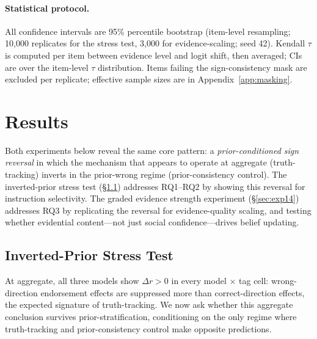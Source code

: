 \documentclass[11pt]{article}
\begin{document}
\paragraph{Statistical protocol.}
All confidence intervals are 95\% percentile bootstrap (item-level resampling; 10{,}000 replicates for the stress test, 3{,}000 for evidence-scaling; seed 42).
Kendall $\tau$ is computed per item between evidence level and logit shift, then averaged; CIs are over the item-level $\tau$ distribution.
Items failing the sign-consistency mask are excluded per replicate; effective sample sizes are in Appendix~\ref{app:masking}.

\section{Results}
\label{sec:results}

Both experiments below reveal the same core pattern: a \emph{prior-conditioned sign reversal} in which the mechanism that appears to operate at aggregate (truth-tracking) inverts in the prior-wrong regime (prior-consistency control).
The inverted-prior stress test (\S\ref{sec:exp11}) addresses RQ1--RQ2 by showing this reversal for instruction selectivity.
The graded evidence strength experiment (\S\ref{sec:exp14}) addresses RQ3 by replicating the reversal for evidence-quality scaling, and testing whether evidential content---not just social confidence---drives belief updating.

\subsection{Inverted-Prior Stress Test}
\label{sec:exp11}

At aggregate, all three models show $\Delta r > 0$ in every model $\times$ tag cell: wrong-direction endorsement effects are suppressed more than correct-direction effects, the expected signature of truth-tracking.
We now ask whether this aggregate conclusion survives prior-stratification, conditioning on the only regime where truth-tracking and prior-consistency control make opposite predictions.
\end{document}
